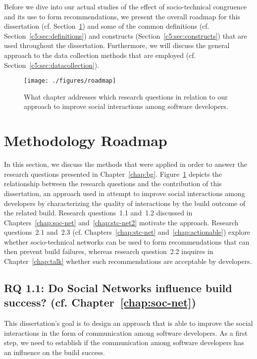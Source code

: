 \label{chap:meth}
Before we dive into our actual studies of the effect of socio-technical congruence and its use to form recommendations, we present the overall roadmap for this dissertation (cf. Section~\ref{c5:sec:roadmap}) and some of the common definitions (cf. Section~\ref{c5:sec:definitions}) and constructs (Section~\ref{c5:sec:constructs}) that are used throughout the dissertation.
Furthermore, we will discuss the general approach to the data collection methods that are employed (cf. Section~\ref{c5:sec:datacollection}).

\begin{figure}[h!]
\centering
\texttt{[image: ./figures/roadmap]}
\caption{What chapter addresses which research questions in relation to our approach to improve social interactions among software developers.}
\label{fig:roadmap}
\end{figure}

\section{Methodology Roadmap}
\label{c5:sec:roadmap}
In this section, we discuss the methods that were applied in order to answer the research questions presented in Chapter~\ref{chap:bg}.
Figure~\ref{fig:roadmap} depicts the relationship between the research questions and the contribution of this dissertation, an approach used in attempt to improve social interactions among developers by characterizing the quality of interactions by the build outcome of the related build.
Research questions~1.1 and~1.2 discussed in Chapters~\ref{chap:soc-net} and~\ref{chap:stc-net2} motivate the approach.
Research questions~2.1 and~2.3 (cf. Chapters~\ref{chap:stc-net} and~\ref{chap:actionable}) explore whether socio-technical networks can be used to form recommendations that can then prevent build failures, whereas research question~2.2 inquires in Chapter~\ref{chap:talk} whether such recommendations are acceptable by developers.

\subsection{%
  RQ 1.1: Do Social Networks influence build success? (cf. Chapter~\ref{chap:soc-net})}
This dissertation's goal is to design an approach that is able to improve the social interactions in the form of communication among software developers.
As a first step, we need to establish if the communication among software developers has an influence on the build success.

